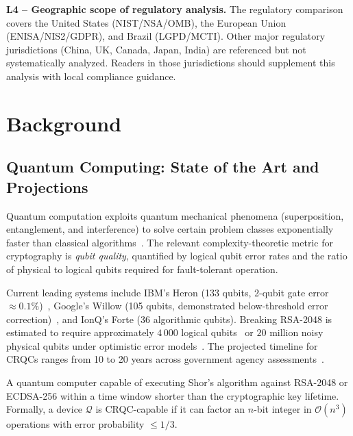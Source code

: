 \documentclass[journal]{IEEEtran}
\begin{document}
\textbf{L4 -- Geographic scope of regulatory analysis.} The regulatory
comparison covers the United States (NIST/NSA/OMB), the European Union
(ENISA/NIS2/GDPR), and Brazil (LGPD/MCTI). Other major regulatory
jurisdictions (China, UK, Canada, Japan, India) are referenced but not
systematically analyzed. Readers in those jurisdictions should supplement
this analysis with local compliance guidance.

\FloatBarrier
\section{Background}
\label{sec:background}

\subsection{Quantum Computing: State of the Art and Projections}

Quantum computation exploits quantum mechanical phenomena (superposition,
entanglement, and interference) to solve certain problem classes exponentially
faster than classical algorithms~\cite{nielsen2010quantum}. The relevant
complexity-theoretic metric for cryptography is \emph{qubit quality}, quantified
by logical qubit error rates and the ratio of physical to logical qubits
required for fault-tolerant operation.

Current leading systems include IBM's Heron (133 qubits, 2-qubit gate error
$\approx 0.1\%$)~\cite{ibm2024heron}, Google's Willow (105 qubits, demonstrated
below-threshold error correction)~\cite{google2024willow}, and IonQ's Forte
(36 algorithmic qubits). Breaking RSA-2048 is estimated to require
approximately $4\,000$ logical qubits~\cite{banegas2021automated} or
$20$ million noisy physical qubits under optimistic error models~\cite{webber2022impact}.
The projected timeline for CRQCs ranges from 10 to 20 years across government
agency assessments~\cite{mosca2018cybersecurity,odni2023atr}.

\begin{definition}
A quantum computer capable of executing Shor's algorithm against RSA-2048 or
ECDSA-256 within a time window shorter than the cryptographic key lifetime.
Formally, a device $\mathcal{Q}$ is CRQC-capable if it can factor an
$n$-bit integer in $\mathcal{O}(n^3)$ operations with error probability
$\leq 1/3$.
\end{definition}
\end{document}
